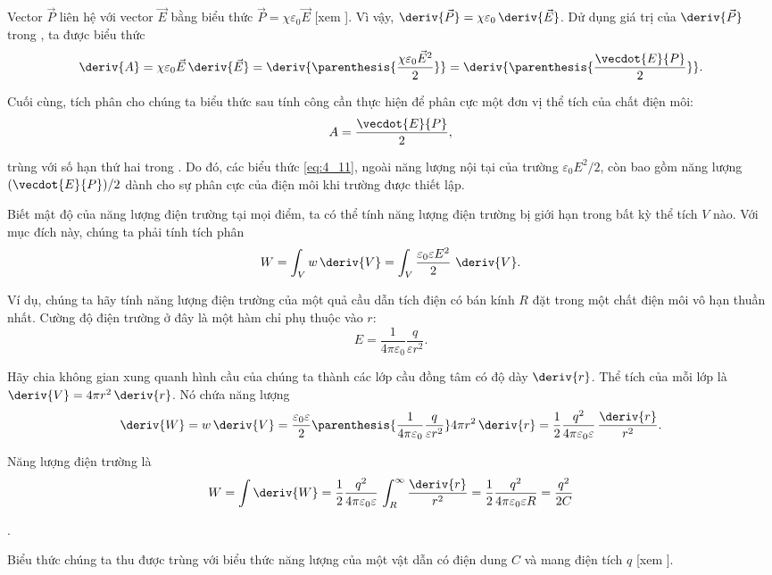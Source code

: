 \noindent
Vector $\vec{P}$ liên hệ với vector $\vec{E}$ bằng biểu thức $\vec{P}=\chi \varepsilon_0\vec{E}$ [xem ]. Vì vậy, $\deriv{\vec{P}}=\chi\varepsilon_0\, \deriv{\vec{E}}$. Dử dụng giá trị của $\deriv{\vec{P}}$ trong , ta được biểu thức
\begin{equation*}
	\deriv{A} = \chi \varepsilon_0 \vec{E}\, \deriv{\vec{E}} = \deriv{\parenthesis{\frac{\chi \varepsilon_0 \vec{E}^2}{2}}} = \deriv{\parenthesis{\frac{\vecdot{E}{P}}{2}}}.
\end{equation*}

\noindent
Cuối cùng, tích phân cho chúng ta biểu thức sau tính công cần thực hiện để phân cực một đơn vị thể tích của chất điện môi:
\begin{equation}\label{eq:4_14}
	A = \frac{\vecdot{E}{P}}{2},
\end{equation}

\noindent
trùng với số hạn thứ hai trong . Do đó, các biểu thức \eqref{eq:4_11}, ngoài năng lượng nội tại của trường $\varepsilon_0 E^2/2$, còn bao gồm năng lượng $(\vecdot{E}{P})/2$ dành cho sự phân cực của điện môi khi trường được thiết lập.

Biết mật độ của năng lượng điện trường tại mọi điểm, ta có thể tính năng lượng điện trường bị giới hạn trong bất kỳ thể tích $V$ nào. Với mục đích này, chúng ta phải tính tích phân
\begin{equation}\label{eq:4_15}
	W = \int_V w\, \deriv{V} = \int_V \frac{\varepsilon_0 \varepsilon E^2}{2}\ \deriv{V}.
\end{equation}

\noindent
Ví dụ, chúng ta hãy tính năng lượng điện trường của một quả cầu dẫn tích điện có bán kính $R$ đặt trong một chất điện môi vô hạn thuần nhất. Cường độ điện trường ở đây là một hàm chỉ phụ thuộc vào $r$:
\begin{equation*}
	E = \frac{1}{4\pi\varepsilon_0} \frac{q}{\varepsilon r^2}.
\end{equation*}

\noindent
Hãy chia không gian xung quanh hình cầu của chúng ta thành các lớp cầu đồng tâm có độ dày $\deriv{r}$. Thể tích của mỗi lớp là $\deriv{V}=4\pi r^2\,\deriv{r}$. Nó chứa năng lượng
\begin{equation*}
	\deriv{W} = w\, \deriv{V} = \frac{\varepsilon_0 \varepsilon}{2} \parenthesis{\frac{1}{4\pi\varepsilon_0} \frac{q}{\varepsilon r^2}} 4\pi r^2\,\deriv{r} = \frac{1}{2} \frac{q^2}{4\pi \varepsilon_0 \varepsilon}\, \frac{\deriv{r}}{r^2}.
\end{equation*}

\noindent
Năng lượng điện trường là
\begin{equation*}
	W =  \int \deriv{W} = \frac{1}{2} \frac{q^2}{4\pi \varepsilon_0 \varepsilon}\, \int_R^{\infty} \frac{\deriv{r}}{r^2} = \frac{1}{2} \frac{q^2}{4\pi \varepsilon_0 \varepsilon R} = \frac{q^2}{2 C}
\end{equation*}

.

Biểu thức chúng ta thu được trùng với biểu thức năng lượng của một vật dẫn có điện dung $C$ và mang điện tích $q$ [xem ].

